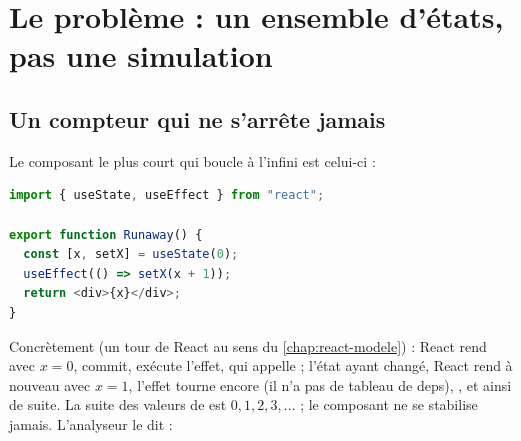\section{Le problème : un ensemble d'états, pas une simulation}
\label{sec:point-fixe-composant-probleme}

\subsection{Un compteur qui ne s'arrête jamais}

Le composant le plus court qui boucle à l'infini est celui-ci :

\begin{lstlisting}[language=TypeScript,caption={La boucle infinie canonique (\file{/tmp/ch13/runaway.tsx})},label={lst:point-fixe-composant-runaway}]
import { useState, useEffect } from "react";

export function Runaway() {
  const [x, setX] = useState(0);
  useEffect(() => setX(x + 1));
  return <div>{x}</div>;
}
\end{lstlisting}

Concrètement (un tour de React au sens du \cref{chap:react-modele}) : React rend  avec
$x = 0$, commit, exécute l'effet, qui appelle  ; l'état ayant
changé, React rend à nouveau avec $x = 1$, l'effet tourne encore (il n'a pas
de tableau de deps), , et ainsi de suite. La suite des valeurs
de  est $0, 1, 2, 3, \dots$ ; le composant ne se stabilise jamais.
L'analyseur le dit :


